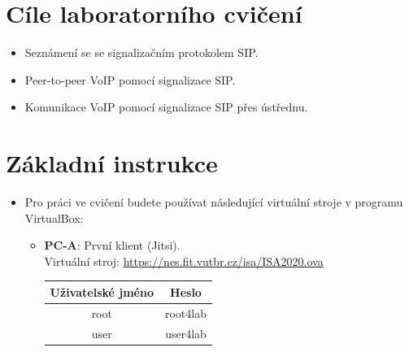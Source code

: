 \section*{Cíle laboratorního cvičení}
\begin{itemize}
  \item Seznámení se se signalizačním protokolem SIP.
  \item Peer-to-peer VoIP pomocí signalizace SIP.
  \item Komunikace VoIP pomocí signalizace SIP přes ústřednu.
\end{itemize}

\section*{Základní instrukce}
\begin{itemize}
  \item Pro práci ve cvičení budete používat následující virtuální stroje v programu VirtualBox:
  \begin{itemize}
	\item \textbf{PC-A}: První klient (Jitsi).\\
	Virtuální stroj: \url{https://nes.fit.vutbr.cz/isa/ISA2020.ova}
	\begin{table}[H]
		\centering
		\begin{tabular}{|c|c|}
		\hline
		\textbf{Uživatelské jméno} & \textbf{Heslo} \\ \hline
		root                       & root4lab       \\ \hline
		user                       & user4lab       \\ \hline
		\end{tabular}
	\end{table}


\end{itemize}
\end{itemize}
